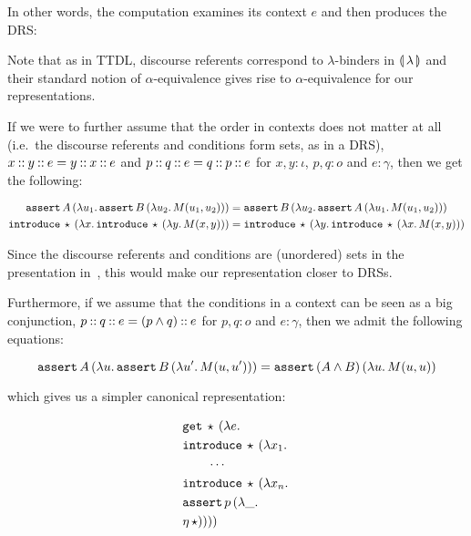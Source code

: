 In other words, the computation examines its context $e$ and then produces
the DRS:

\vspace{2mm}


\vspace{2mm}

Note that as in TTDL, discourse referents correspond to $\lambda$-binders
in $\llparenthesis \, \lambda \, \rrparenthesis$ and their standard notion of $\alpha$-equivalence
gives rise to $\alpha$-equivalence for our representations.

If we were to further assume that the order in contexts does not matter at
all (i.e.\ the discourse referents and conditions form sets, as in a DRS),
$x \mathbin{::} y \mathbin{::} e = y \mathbin{::} x \mathbin{::} e$ and
$p \mathbin{::} q \mathbin{::} e = q \mathbin{::} p \mathbin{::} e$ for $x, y : \iota$, $p, q : o$ and
$e : \gamma$, then we get the following:

\begin{align*}
   \mathtt{assert}\,A\,(\lambda u_1.\, \mathtt{assert}\,B\,(\lambda u_2.\, M(u_1, u_2))) 
&= \mathtt{assert}\,B\,(\lambda u_2.\, \mathtt{assert}\,A\,(\lambda u_1.\, M(u_1, u_2))) \\
   \mathtt{introduce}\,\star\,(\lambda x.\, \mathtt{introduce}\,\star\,(\lambda y.\, M(x, y))) 
&= \mathtt{introduce}\,\star\,(\lambda y.\, \mathtt{introduce}\,\star\,(\lambda x.\, M(x, y)))
\end{align*}

Since the discourse referents and conditions are (unordered) sets in the
presentation in~\cite{kamp1993discourse}, this would make our
representation closer to DRSs.

Furthermore, if we assume that the conditions in a context can be seen as a
big conjunction, $p \mathbin{::} q \mathbin{::} e = (p \land q) \mathbin{::} e$ for $p, q : o$
and $e : \gamma$, then we admit the following equations:

$$
  \mathtt{assert}\,A\,(\lambda u.\, \mathtt{assert}\,B\,(\lambda u'.\, M(u, u'))) 
= \mathtt{assert}\,(A \land B)\,(\lambda u.\, M(u, u))
$$

which gives us a simpler canonical representation:

\begin{align*}
  &\mathtt{get}\,\star\,(\lambda e.\,  \\
  &\mathtt{introduce}\,\star\,(\lambda x_1.\,  \\
  &\qquad \cdots \\
  &\mathtt{introduce}\,\star\,(\lambda x_n.\,  \\
  &\mathtt{assert}\,p\,(\lambda \_.\,  \\
  &\eta\,\star))))
\end{align*}

